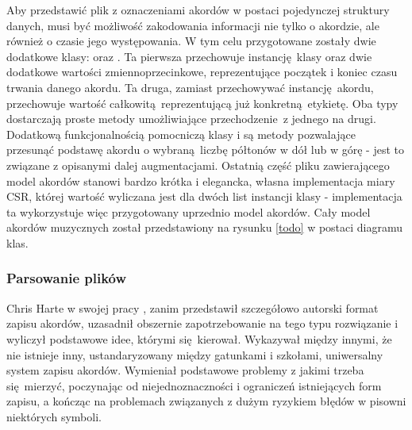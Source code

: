 Aby przedstawić plik z oznaczeniami akordów w postaci pojedynczej struktury danych, musi być
możliwość zakodowania informacji nie tylko o akordzie, ale również o czasie jego występowania. W tym
celu przygotowane zostały dwie dodatkowe klasy:  oraz . Ta
pierwsza przechowuje instancję klasy  oraz dwie dodatkowe wartości zmiennoprzecinkowe,
reprezentujące początek i koniec czasu trwania danego akordu. Ta druga, zamiast przechowywać
instancję akordu, przechowuje wartość całkowitą reprezentującą już konkretną etykietę. Oba typy
dostarczają proste metody umożliwiające przechodzenie z jednego na drugi. Dodatkową funkcjonalnością
pomocniczą klasy  i  są metody pozwalające przesunąć podstawę
akordu o wybraną liczbę półtonów w dół lub w górę - jest to związane z opisanymi dalej
augmentacjami. Ostatnią część pliku zawierającego model akordów stanowi bardzo krótka i elegancka,
własna implementacja miary CSR, której wartość wyliczana jest dla dwóch list instancji klasy
 - implementacja ta wykorzystuje więc przygotowany uprzednio model akordów.
Cały model akordów muzycznych został przedstawiony na rysunku \ref{todo} w postaci diagramu klas.

\subsubsection{Parsowanie plików }

Chris Harte w swojej pracy \cite{harte_towards_nodate}, zanim przedstawił szczegółowo autorski
format zapisu akordów, uzasadnił obszernie zapotrzebowanie na tego typu rozwiązanie i wyliczył
podstawowe idee, którymi się kierował. Wykazywał między innymi, że nie istnieje inny,
ustandaryzowany między gatunkami i szkołami, uniwersalny system zapisu akordów.  Wymieniał
podstawowe problemy z jakimi trzeba się mierzyć, poczynając od niejednoznaczności i ograniczeń
istniejących form zapisu, a kończąc na problemach związanych z dużym ryzykiem błędów w pisowni
niektórych symboli.

